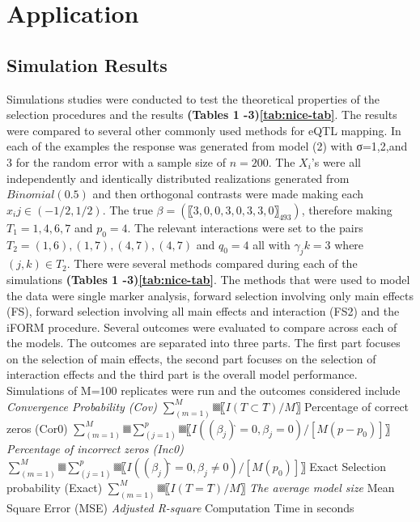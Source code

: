\documentclass[]{book}
\theoremstyle{definition}
\theoremstyle{definition}
\theoremstyle{remark}
\begin{document}
\section{Application}\label{application}

\subsection{Simulation Results}\label{simulation-results}

Simulations studies were conducted to test the theoretical properties of
the selection procedures and the results \textbf{(Tables 1
-3)\ref{tab:nice-tab}}. The results were compared to several other
commonly used methods for eQTL mapping. In each of the examples the
response was generated from model (2) with σ=1,2,and 3 for the random
error with a sample size of \(n=200\). The \(X_i\)'s were all
independently and identically distributed realizations generated from
\(Binomial(0.5)\) and then orthogonal contrasts were made making each
\(x_ij∈(-1/2,1/2)\). The true \(β=(〖3,0,0,3,0,3,3,0〗_493)\), therefore
making \(T_1={1,4,6,7}\) and \(p_0=4\). The relevant interactions were
set to the pairs \(T_2={(1,6),(1,7),(4,7),(4,7)}\) and \(q_0=4\) all
with \(γ_jk=3\) where \((j,k)∈T_2\). There were several methods compared
during each of the simulations \textbf{(Tables 1 -3)\ref{tab:nice-tab}}.
The methods that were used to model the data were single marker
analysis, forward selection involving only main effects (FS), forward
selection involving all main effects and interaction (FS2) and the iFORM
procedure. Several outcomes were evaluated to compare across each of the
models. The outcomes are separated into three parts. The first part
focuses on the selection of main effects, the second part focuses on the
selection of interaction effects and the third part is the overall model
performance. Simulations of M=100 replicates were run and the outcomes
considered include \emph{Convergence Probability (Cov)
\(∑_(m=1)^M▒〖I(T⊂T ̂ )/M〗\) }Percentage of correct zeros (Cor0)
\(∑_(m=1)^M▒∑_(j=1)^p▒〖I((β_j ) ̂=0,β_j=0)/[M(p-p_0)]〗\)
\emph{Percentage of incorrect zeros (Inc0)
\(∑_(m=1)^M▒∑_(j=1)^p▒〖I((β_j ) ̂=0,β_j≠0)/[M(p_0)]〗\) }Exact Selection
probability (Exact) \(∑_(m=1)^M▒〖I(T=T ̂ )/M 〗\) \emph{The average
model size }Mean Square Error (MSE) \emph{Adjusted R-square }Computation
Time in seconds
\end{document}
